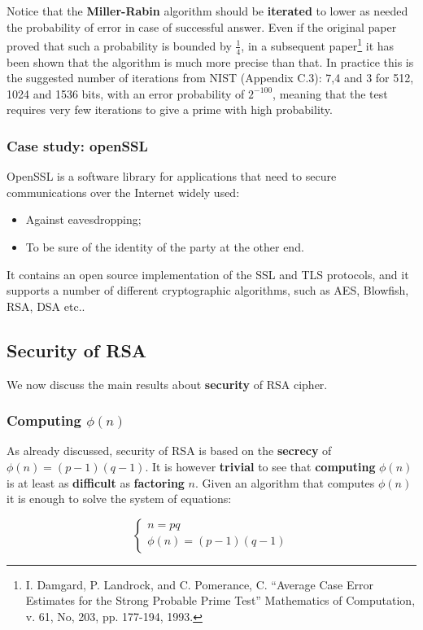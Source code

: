 Notice that the \textbf{Miller-Rabin} algorithm should be \textbf{iterated} to lower as needed the probability of error in case of successful answer. Even if the original paper proved that such a probability is bounded by $\frac{1}{4}$, in a subsequent paper\footnote{I. Damgard, P. Landrock, and C. Pomerance, C. “Average Case Error Estimates for the Strong Probable Prime Test” Mathematics of Computation, v. 61, No, 203, pp. 177-194, 1993.} it has been shown that the algorithm is much more precise than that. In practice this is the suggested number of iterations from NIST (Appendix C.3): 7,4 and 3 for 512, 1024 and 1536 bits, with an error probability of $2^{-100}$, meaning that the test requires very few iterations to give a prime with high probability.

\subsubsection{Case study: openSSL}
OpenSSL is a software library for applications that need to secure communications over the Internet widely used:

\begin{itemize}
    \item Against eavesdropping;
    \item To be sure of the identity of the party at the other end.
\end{itemize}

It contains an open source implementation of the SSL and TLS protocols, and it supports a number of different cryptographic algorithms, such as AES, Blowfish, RSA, DSA etc..

\subsection{Security of RSA}
We now discuss the main results about \textbf{security} of RSA cipher.

\subsubsection{Computing $\phi(n)$}
As already discussed, security of RSA is based on the \textbf{secrecy} of $\phi(n)=(p-1)(q-1)$. It is however \textbf{trivial} to see that \textbf{computing} $\phi(n)$ is at least as \textbf{difficult} as \textbf{factoring} $n$. Given an algorithm that computes $\phi(n)$ it is enough to solve the system of equations:

$$
\begin{cases}
    n = pq \\
    \phi(n) = (p-1)(q-1)
\end{cases}
$$

